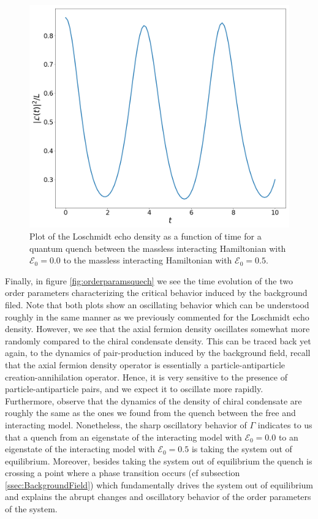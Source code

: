 \begin{figure}[h]
	\centering
	\includegraphics[scale=0.25]{figures/LoschmidtInteractingQuenchMassless.png}
	\caption{Plot of the Loschmidt echo density as a function of time  for a quantum quench between the massless interacting Hamiltonian with $\mathcal{E}_0=0.0$ to the massless interacting Hamiltonian with $\mathcal{E}_0=0.5$.}
	\label{fig:loschmidtinteractingquench}
\end{figure}

Finally, in figure \ref{fig:orderparamsquech} we see the time evolution of the two order parameters characterizing the critical behavior induced by the background filed. Note that both plots show an oscillating behavior which can be understood roughly in the same manner as we previously commented for the Loschmidt echo density. However, we see that the axial fermion density oscillates somewhat more randomly compared to the chiral condensate density. This can be traced back yet again, to the dynamics of pair-production induced by the background field, recall that the axial fermion density operator is essentially a particle-antiparticle creation-annihilation operator. Hence, it is very sensitive to the presence of particle-antiparticle pairs, and we expect it to oscillate more rapidly. Furthermore, observe that the dynamics of the density of chiral condensate are roughly the same as the ones we found from the quench between the free and interacting model. Nonetheless, the sharp oscillatory behavior of $\Gamma$ indicates to us that a quench from an eigenstate of the interacting model with $\mathcal{E}_0=0.0$ to an eigenstate of the interacting model with $\mathcal{E}_0=0.5$ is taking the system out of equilibrium. Moreover, besides taking the system out of equilibrium the quench is crossing a point where a phase transition occurs (cf subsection \ref{ssec:BackgroundField}) which fundamentally drives the system out of equilibrium and explains the abrupt changes and oscillatory behavior of the order parameters of the system.


